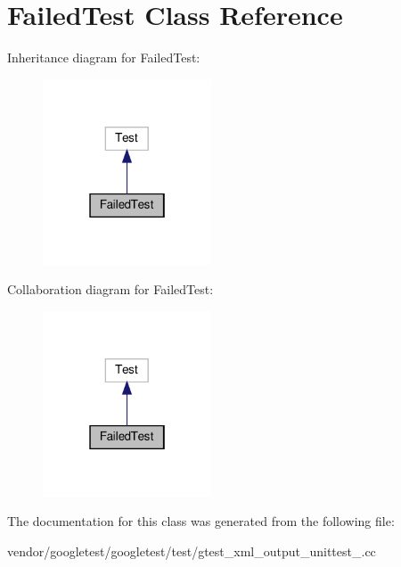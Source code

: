 \hypertarget{class_failed_test}{}\section{Failed\+Test Class Reference}
\label{class_failed_test}


Inheritance diagram for Failed\+Test\+:
\nopagebreak
\begin{figure}[H]
\begin{center}
\leavevmode
\includegraphics[width=142pt]{class_failed_test__inherit__graph}
\end{center}
\end{figure}


Collaboration diagram for Failed\+Test\+:
\nopagebreak
\begin{figure}[H]
\begin{center}
\leavevmode
\includegraphics[width=142pt]{class_failed_test__coll__graph}
\end{center}
\end{figure}


The documentation for this class was generated from the following file\+:\begin{DoxyCompactItemize}
\item 
vendor/googletest/googletest/test/gtest\+\_\+xml\+\_\+output\+\_\+unittest\+\_\+.\+cc\end{DoxyCompactItemize}
